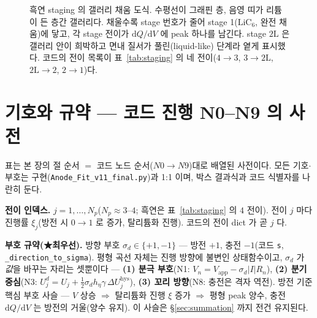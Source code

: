 \documentclass[11pt,a4paper]{article}
\newcommand{\dd}{\mathrm{d}}
\newcommand{\app}{\mathrm{app}}
\newcommand{\hys}{\mathrm{hys}}
\newcommand{\code}[1]{\texttt{#1}}
\begin{document}
\begin{figure}[t]
\caption{흑연 staging 의 갤러리 채움 도식. 수평선이 그래핀 층, 음영 띠가 리튬이 든 층간
갤러리다. 채울수록 stage 번호가 줄어 stage 1($\mathrm{LiC_6}$, 완전 채움)에 닿고, 각 stage 전이가
$\dd Q/\dd V$ 에 peak 하나를 남긴다. stage $2\mathrm L$ 은 갤러리 안이 희박하고 면내 질서가 풀린(liquid-like)
단계라 옅게 표시했다. 코드의 전이 목록이 표~\ref{tab:staging} 의 네 전이($4\!\to\!3$, $3\!\to\!2\mathrm L$, $2\mathrm L\!\to\!2$, $2\!\to\!1$)다.}
\label{fig:staging}
\end{figure}

\tableofcontents
\newpage

\section{기호와 규약 — 코드 진행 N0--N9 의 사전}\label{sec:notation}
표는 본 장의 절 순서 $=$ 코드 노드 순서($N0\!\to\!N9$)대로 배열된 사전이다. 모든 기호$\cdot$부호는 구현(\code{Anode\_Fit\_v11\_final.py})과 1:1 이며, 박스 결과식과 코드 식별자를 나란히 둔다.

\textbf{전이 인덱스.} $j=1,\dots,N_p$($N_p\approx3$--$4$; 흑연은 표~\ref{tab:staging} 의 $4$ 전이). 전이 $j$ 마다 진행률 $\xi_j$(방전 시 $0\to1$ 로 증가, 탈리튬화 진행). 코드의 전이 dict 가 곧 $j$ 다.

\textbf{부호 규약(★최우선).} 방향 부호 $\sigma_d\in\{+1,-1\}$ — 방전 $+1$, 충전 $-1$(코드 \code{s}, \code{\_direction\_to\_sigma}). 평형 곡선 자체는 진행 방향에 불변인 상태함수이고, $\sigma_d$ 가 \emph{값}을 바꾸는 자리는 셋뿐이다 — \textbf{(1) 분극 부호}(N1: $V_n=V_\app-\sigma_d|I|R_n$), \textbf{(2) 분기 중심}(N3: $U_j^d=U_j+\tfrac12\sigma_d h_\eta\gamma\,\Delta U_j^\hys$), \textbf{(3) 꼬리 방향}(N8: 충전은 격자 역전). 방전 기준 핵심 부호 사슬 — $V$ 상승 $\Rightarrow$ 탈리튬화 진행 $\xi$ 증가 $\Rightarrow$ 평형 peak 양수, 충전 $\dd Q/\dd V$ 는 방전의 거울(양수 유지). 이 사슬은 §\ref{sec:summation} 까지 전건 유지된다.
\end{document}
